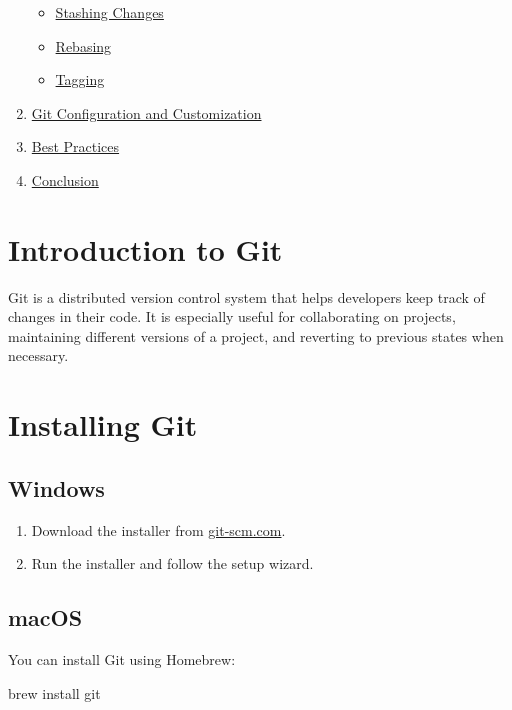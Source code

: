 \documentclass[
  letterpaper,
  DIV=11,
  numbers=noendperiod]{scrreprt}
\newenvironment{Shaded}{\begin{snugshade}}{\end{snugshade}}
\newcommand{\ExtensionTok}[1]{\textcolor[rgb]{0.00,0.23,0.31}{#1}}
\newcommand{\NormalTok}[1]{\textcolor[rgb]{0.00,0.23,0.31}{#1}}
\providecommand{\tightlist}{%
  \setlength{\itemsep}{0pt}\setlength{\parskip}{0pt}}\usepackage{longtable,booktabs,array}
\begin{document}
\begin{enumerate}
  \begin{itemize}
  \tightlist
  \item
    \hyperref[stashing-changes]{Stashing Changes}
  \item
    \hyperref[rebasing]{Rebasing}
  \item
    \hyperref[tagging]{Tagging}
  \end{itemize}
\item
  \hyperref[git-configuration-and-customization]{Git Configuration and
  Customization}
\item
  \hyperref[best-practices]{Best Practices}
\item
  \hyperref[conclusion]{Conclusion}
\end{enumerate}

\section{Introduction to Git}\label{introduction-to-git}

Git is a distributed version control system that helps developers keep
track of changes in their code. It is especially useful for
collaborating on projects, maintaining different versions of a project,
and reverting to previous states when necessary.

\section{Installing Git}\label{installing-git}

\subsection{Windows}\label{windows-2}

\begin{enumerate}
\def\labelenumi{\arabic{enumi}.}
\tightlist
\item
  Download the installer from
  \href{https://git-scm.com/download/win}{git-scm.com}.
\item
  Run the installer and follow the setup wizard.
\end{enumerate}

\subsection{macOS}\label{macos-1}

You can install Git using Homebrew:

\begin{Shaded}
\begin{Highlighting}[]
\ExtensionTok{brew}\NormalTok{ install git}
\end{Highlighting}
\end{Shaded}
\end{document}
